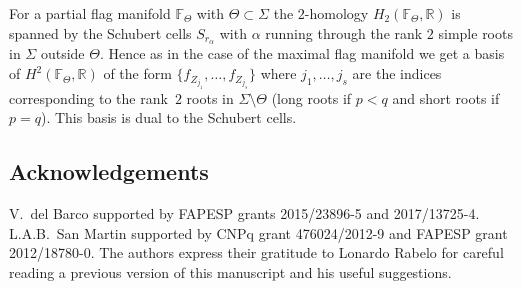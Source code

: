 \documentclass[pdftex]{sigma}
\numberwithin{equation}{section}
\begin{document}
For a partial flag manifold $\mathbb{F}_{\Theta }$ with $\Theta \subset \Sigma $ the $2$-homology $H_{2}(\mathbb{F}_{\Theta },\mathbb{R})$ is spanned by the Schubert cells $S_{r_{\alpha }}$ with $\alpha $ running
through the rank $2$ simple roots in $\Sigma $ outside $\Theta $. Hence as in the case of the maximal flag manifold we get a basis of $H^{2}(\mathbb{F}_{\Theta },\mathbb{R})$ of the form $\{f_{Z_{j_{1}}},\ldots,f_{Z_{j_{s}}}\}$ where $j_{1},\ldots,j_{s}$ are the indices corresponding to the rank~$2$ roots in $\Sigma \setminus \Theta $ (long roots if $p<q$ and short roots if $p=q$). This basis is dual to the Schubert cells.

\subsection*{Acknowledgements}

V.~del Barco supported by FAPESP grants 2015/23896-5 and 2017/13725-4. L.A.B.~San Martin supported by CNPq grant 476024/2012-9 and FAPESP grant 2012/18780-0. The authors express their gratitude to Lonardo Rabelo for careful reading a previous version of this manuscript and his useful suggestions.
\end{document}
